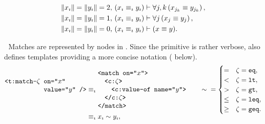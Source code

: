 \def\xyequivish{\varsub x\equivish \varsub y}

\begin{axiom}
\indexsym{}
  \begin{align*}
    \rank{\varsub x}=\rank{\varsub y}=2,\,
      (\xyequivish) &\infer \Forall{j,k}{x_{j_k} \equiv y_{j_k}}, \\
    \rank{\varsub x}=\rank{\varsub y}=1,\,
      (\xyequivish) &\infer \Forall{j}{x_j \equiv y_j}, \\
    \rank{\varsub x}=\rank{\varsub y}=0,\,
      (\xyequivish) &\infer (x\equiv y).
  \end{align*}
\end{axiom}


Matches are represented by  nodes in \tame{}.
Since the primitive is rather verbose,
   also defines templates providing a more concise
    notation
      ( below).

\begin{axiom}
  \begin{alignat*}{2}
    \begin{aligned}[b]
      \xml{<t:match-$\zeta$ }&\xml{on="$x$"} \xmlnll
                             &\xml{value="$y$" />}
    \end{aligned}
    {}&\equivish{}
    \begin{aligned}
      &\xml{<match on="$x$">} \xmlnll
      &\quad \xml{<c:$\zeta$>} \xmlnll
      &\quad\quad \xml{<c:value-of name="$y$">} \xmlnll
      &\quad \xml{</c:$\zeta$>} \xmlnll
      &\xml{</match>}
    \end{aligned}
    \qquad
    \sim{} = \smash{\begin{cases}
             =    &\zeta=\xml{eq},  \\
             <    &\zeta=\xml{lt},  \\
             >    &\zeta=\xml{gt},  \\
             \leq &\zeta=\xml{leq}, \\
             \geq &\zeta=\xml{geq}.
           \end{cases}} \\
  &\equivish \varsub x \sim \varsub y,
  \end{alignat*}
\end{axiom}

